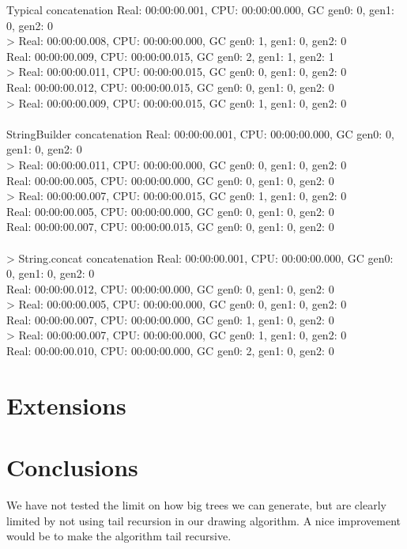 \documentclass[10pt]{scrartcl}
\begin{document}
Typical concatenation
Real: 00:00:00.001, CPU: 00:00:00.000, GC gen0: 0, gen1: 0, gen2: 0\\
> Real: 00:00:00.008, CPU: 00:00:00.000, GC gen0: 1, gen1: 0, gen2: 0\\
Real: 00:00:00.009, CPU: 00:00:00.015, GC gen0: 2, gen1: 1, gen2: 1\\
> Real: 00:00:00.011, CPU: 00:00:00.015, GC gen0: 0, gen1: 0, gen2: 0\\
Real: 00:00:00.012, CPU: 00:00:00.015, GC gen0: 0, gen1: 0, gen2: 0\\
> Real: 00:00:00.009, CPU: 00:00:00.015, GC gen0: 1, gen1: 0, gen2: 0\\\\
StringBuilder concatenation
Real: 00:00:00.001, CPU: 00:00:00.000, GC gen0: 0, gen1: 0, gen2: 0\\
> Real: 00:00:00.011, CPU: 00:00:00.000, GC gen0: 0, gen1: 0, gen2: 0\\
Real: 00:00:00.005, CPU: 00:00:00.000, GC gen0: 0, gen1: 0, gen2: 0\\
> Real: 00:00:00.007, CPU: 00:00:00.015, GC gen0: 1, gen1: 0, gen2: 0\\
Real: 00:00:00.005, CPU: 00:00:00.000, GC gen0: 0, gen1: 0, gen2: 0\\
Real: 00:00:00.007, CPU: 00:00:00.015, GC gen0: 0, gen1: 0, gen2: 0\\\\
> String.concat concatenation
Real: 00:00:00.001, CPU: 00:00:00.000, GC gen0: 0, gen1: 0, gen2: 0\\
Real: 00:00:00.012, CPU: 00:00:00.000, GC gen0: 0, gen1: 0, gen2: 0\\
> Real: 00:00:00.005, CPU: 00:00:00.000, GC gen0: 0, gen1: 0, gen2: 0\\
Real: 00:00:00.007, CPU: 00:00:00.000, GC gen0: 1, gen1: 0, gen2: 0\\
> Real: 00:00:00.007, CPU: 00:00:00.000, GC gen0: 1, gen1: 0, gen2: 0\\
Real: 00:00:00.010, CPU: 00:00:00.000, GC gen0: 2, gen1: 0, gen2: 0\\
\section{Extensions}
\section{Conclusions}
We have not tested the limit on how big trees we can generate, but are clearly limited by not using tail recursion in our drawing algorithm. A nice improvement would be to make the algorithm tail recursive.



\end{document}
